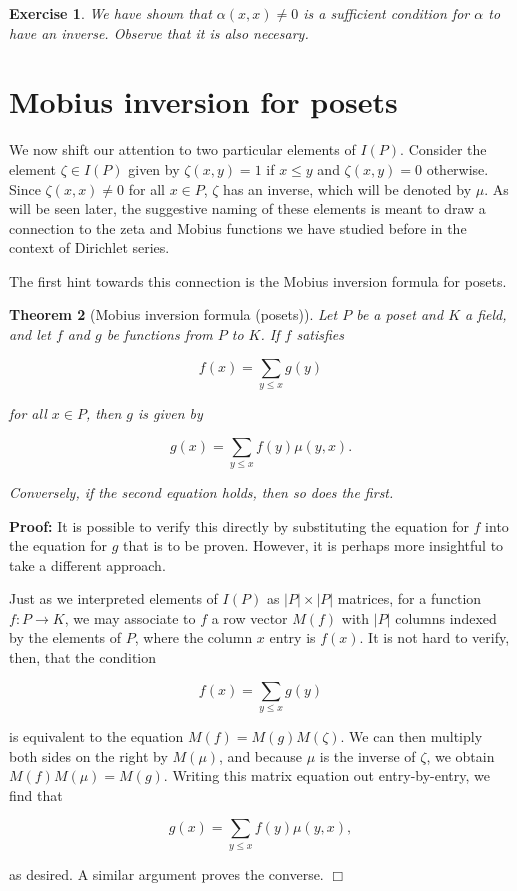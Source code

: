 \documentclass[11pt]{article}
\newtheorem{theorem}{Theorem}
\newtheorem{exercise}[theorem]{Exercise}
\newenvironment{proof}{\noindent \textbf{Proof:}}{$\Box$}
\begin{document}
\begin{exercise}
We have shown that $\alpha(x, x) \ne 0$ is a sufficient condition for
$\alpha$ to have an inverse. Observe that it is also necesary.
\end{exercise}

\section{Mobius inversion for posets}

We now shift our attention to two particular elements of
$I(P)$. Consider the element $\zeta \in I(P)$ given by $\zeta(x, y) =
1$ if $x \le y$ and $\zeta(x, y) = 0$ otherwise. Since $\zeta(x, x)
\ne 0$ for all $x \in P$, $\zeta$ has an inverse, which will be
denoted by $\mu$. As will be seen later, the suggestive naming of
these elements is meant to draw a connection to the zeta and Mobius
functions we have studied before in the context of Dirichlet series.

The first hint towards this connection is the Mobius inversion formula
for posets.

\begin{theorem}[Mobius inversion formula (posets)] \label{mobius inversion}
  Let $P$ be a poset and $K$ a field, and let $f$ and $g$ be functions
  from $P$ to $K$. If $f$ satisfies

  \[ f(x) = \sum_{y \le x} g(y) \]

  for all $x \in P$, then $g$ is given by

  \[ g(x) = \sum_{y \le x} f(y) \mu(y, x). \]

  Conversely, if the second equation holds, then so does the first.
\end{theorem}
\begin{proof}
  It is possible to verify this directly by substituting the equation
  for $f$ into the equation for $g$ that is to be proven. However, it
  is perhaps more insightful to take a different approach.

  Just as we interpreted elements of $I(P)$ as $|P| \times |P|$
  matrices, for a function $f : P \to K$, we may associate to $f$ a
  row vector $M(f)$ with $|P|$ columns indexed by the elements of $P$,
  where the column $x$ entry is $f(x)$. It is not hard to verify,
  then, that the condition

  \[ f(x) = \sum_{y \le x} g(y) \]

  is equivalent to the equation $M(f) = M(g)M(\zeta)$. We can then
  multiply both sides on the right by $M(\mu)$, and because $\mu$ is
  the inverse of $\zeta$, we obtain $M(f)M(\mu) = M(g)$. Writing this
  matrix equation out entry-by-entry, we find that

  \[ g(x) = \sum_{y \le x} f(y) \mu(y, x), \]

  as desired. A similar argument proves the converse.
\end{proof}
\end{document}
